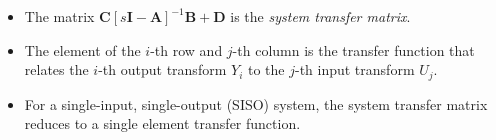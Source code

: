 \begin{itemize}
\item The matrix
$\mathbf{C}\left[s\mathbf{I}-\mathbf{A}\right]^{-1}\mathbf{B}+\mathbf{D}$
is the \emph{system transfer matrix}.
\item The element of the $i$-th
row and $j$-th column is the transfer function that relates the
$i$-th output transform $Y_i$ to the $j$-th input transform $U_j$.
\item
For a single-input, single-output (SISO) system, the system transfer matrix reduces to a
single element transfer function.
\end{itemize}

\endinput

